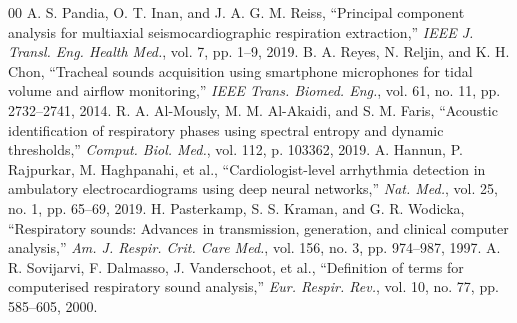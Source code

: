\documentclass[journal]{IEEEtran}
\begin{document}
\begin{thebibliography}{00}
 A. S. Pandia, O. T. Inan, and J. A. G. M. Reiss, ``Principal component analysis for multiaxial seismocardiographic respiration extraction,'' \textit{IEEE J. Transl. Eng. Health Med.}, vol. 7, pp. 1--9, 2019.
 B. A. Reyes, N. Reljin, and K. H. Chon, ``Tracheal sounds acquisition using smartphone microphones for tidal volume and airflow monitoring,'' \textit{IEEE Trans. Biomed. Eng.}, vol. 61, no. 11, pp. 2732--2741, 2014.
 R. A. Al-Mously, M. M. Al-Akaidi, and S. M. Faris, ``Acoustic identification of respiratory phases using spectral entropy and dynamic thresholds,'' \textit{Comput. Biol. Med.}, vol. 112, p. 103362, 2019.
 A. Hannun, P. Rajpurkar, M. Haghpanahi, et al., ``Cardiologist-level arrhythmia detection in ambulatory electrocardiograms using deep neural networks,'' \textit{Nat. Med.}, vol. 25, no. 1, pp. 65--69, 2019.
 H. Pasterkamp, S. S. Kraman, and G. R. Wodicka, ``Respiratory sounds: Advances in transmission, generation, and clinical computer analysis,'' \textit{Am. J. Respir. Crit. Care Med.}, vol. 156, no. 3, pp. 974--987, 1997.
 A. R. Sovijarvi, F. Dalmasso, J. Vanderschoot, et al., ``Definition of terms for computerised respiratory sound analysis,'' \textit{Eur. Respir. Rev.}, vol. 10, no. 77, pp. 585--605, 2000.
\end{thebibliography}
\end{document}
